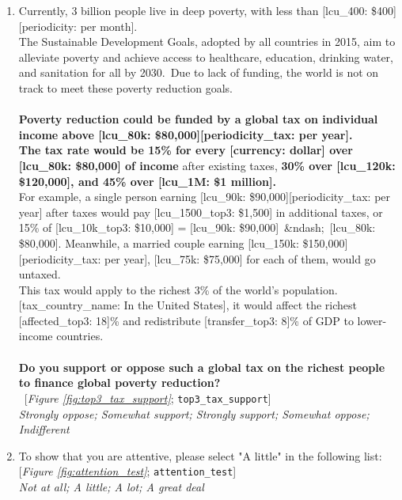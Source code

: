 \begin{enumerate}[resume]
\item  \label{q:top3_tax_support} Currently, 3 billion people live in deep poverty, with less than [lcu\_400: \$400][periodicity: per month].\\The Sustainable Development Goals, adopted by all countries in 2015, aim to alleviate poverty and achieve access to healthcare, education, drinking water, and sanitation for all by 2030.~Due to lack of funding, the world is not on track to meet these poverty reduction goals.\\\\\textbf{Poverty reduction could be funded by a global tax on individual income above [lcu\_80k: \$80,000][periodicity\_tax: per year].~\\The tax rate would be 15\% for every [currency: dollar] over [lcu\_80k: \$80,000] of income} after existing taxes, \textbf{30\% over [lcu\_120k: \$120,000], and 45\% over [lcu\_1M: \$1 million].~}\\For example, a single person earning [lcu\_90k: \$90,000][periodicity\_tax: per year] after taxes would pay [lcu\_1500\_top3: \$1,500] in additional taxes, or 15\% of [lcu\_10k\_top3: \$10,000] = [lcu\_90k: \$90,000]~\&ndash;~[lcu\_80k: \$80,000]. Meanwhile, a married couple earning [lcu\_150k: \$150,000][periodicity\_tax: per year], [lcu\_75k: \$75,000] for each of them, would go untaxed.\\This tax would apply to the richest 3\% of the world's population. [tax\_country\_name: In the United States], it would affect the richest [affected\_top3: 18]\% and redistribute [transfer\_top3: 8]\% of GDP to lower-income countries.\\\\\textbf{Do you support or oppose such a global tax on the richest people to finance global poverty reduction?}\\ 
~[\textit{Figure \ref{fig:top3_tax_support}}; 
\verb|top3_tax_support|]
  \\ \textit{Strongly oppose; Somewhat support; Strongly support; Somewhat oppose; Indifferent}

\item  \label{q:attention_test} To show that you are attentive, please select "A little" in the following list: [\textit{Figure \ref{fig:attention_test}}; 
\verb|attention_test|]
  \\ \textit{Not at all; A little; A lot; A great deal}

\end{enumerate} 

